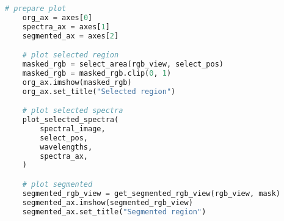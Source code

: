 \begin{lstlisting}[language=python, caption=\texttt{segmentation.py} , label={code:segmentation}]
    # prepare plot
    org_ax = axes[0]
    spectra_ax = axes[1]
    segmented_ax = axes[2]

    # plot selected region
    masked_rgb = select_area(rgb_view, select_pos)
    masked_rgb = masked_rgb.clip(0, 1)
    org_ax.imshow(masked_rgb)
    org_ax.set_title("Selected region")

    # plot selected spectra
    plot_selected_spectra(
        spectral_image,
        select_pos,
        wavelengths,
        spectra_ax,
    )

    # plot segmented
    segmented_rgb_view = get_segmented_rgb_view(rgb_view, mask)
    segmented_ax.imshow(segmented_rgb_view)
    segmented_ax.set_title("Segmented region")


\end{lstlisting}
